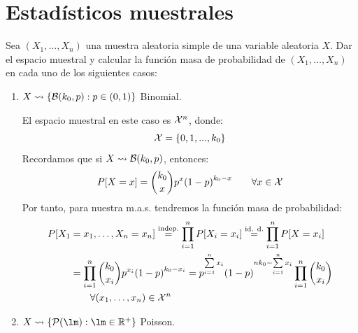 \section{Estadísticos muestrales}

\begin{ejercicio}
    Sea $(X_1, \ldots, X_n)$ una muestra aleatoria simple de una variable aleatoria $X$. Dar el espacio muestral y calcular la función masa de probabilidad de $(X_1, \ldots, X_n)$ en cada uno de los siguientes casos:
    \begin{enumerate}[label=\alph*)]
        \item $X\rightsquigarrow \{\mathcal{B}(k_0,p) : p\in (0,1)\}$ Binomial.

            El espacio muestral en este caso es $\mathcal{X}^n$, donde:
            \begin{equation*}
                \mathcal{X} = \{0, 1, ..., k_0\}
            \end{equation*}
            Recordamos que si $X\rightsquigarrow \mathcal{B}(k_0,p)$, entonces:
            \begin{equation*}
                P[X=x] = \binom{k_0}{x} p^x {(1-p)}^{k_0-x} \qquad \forall x\in \mathcal{X}
            \end{equation*}
            Por tanto, para nuestra m.a.s. tendremos la función masa de probabilidad:
            \begin{align*}
                P[X_1 &= x_1, \ldots, X_n = x_n] \stackrel{\text{indep.}}{=} \prod_{i=1}^{n}P[X_i = x_i]\stackrel{\text{id. d.}}{=} \prod_{i=1}^{n} P[X=x_i] \\
                      &= \prod_{i=1}^{n} \binom{k_0}{x_i} p^{x_i} {(1-p)}^{k_0-x_i} = p^{\sum\limits_{i=1}^{n}x_i} {(1-p)}^{nk_0 - \sum\limits_{i=1}^{n}x_i} \prod_{i=1}^{n}\binom{k_0}{x_i} \\
                      & \qquad \forall (x_1, \ldots, x_n) \in \mathcal{X}^n
            \end{align*}
        \item $X\rightsquigarrow\{\cc{P}(\lm) : \lm \in \mathbb{R}^+\}$ Poisson.


\end{enumerate}
\end{ejercicio}
